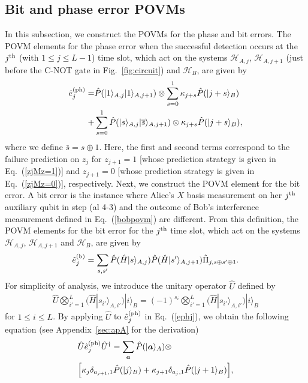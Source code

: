 \documentclass[prl,twocolumn,superscriptaddress,nofootinbib]{revtex4}
\def\U#1{{\rm #1}}
\newcommand{\ket}[1]{| #1 \rangle}
\begin{document}
  \subsection{Bit and phase error POVMs}
  \label{sec:povm}
  In this subsection, we construct the POVMs for the phase and bit errors. 
The POVM elements for the phase error when the successful detection occurs at the $j^{\U{th}}$ (with $1\leq j\leq L-1$) time slot, 
which act on the systems $\mathcal{H}_{A,j}$, $\mathcal{H}_{A,j+1}$ (just before the C-NOT gate in Fig.~\ref{fig:circuit})
and $\mathcal{H}_B$, are given by
\begin{align}
  \hat{e}^{(\U{ph})}_{j}=&\hat{P}(\ket{1}_{A,j}\ket{1}_{A,j+1})\otimes\sum^1_{s=0}\kappa_{j+s}\hat{P}(\ket{j+s}_B)\notag\\
  +&\sum^1_{s=0}\hat{P}(\ket{s}_{A,j}\ket{\overline{s}}_{A,j+1})
  \otimes\kappa_{j+s}\hat{P}(\ket{j+s}_B),
  \label{ephj}
\end{align}
where we define $\bar{s}=s\oplus1$.
Here, the first and second terms correspond to the failure prediction on $z_j$ for $z_{j+1}=1$
[whose prediction strategy is given in  Eq.~(\ref{zjMz=1})]
and $z_{j+1}=0$ [whose prediction strategy is given in Eq.~(\ref{zjMz=0})], respectively. 
Next, we construct the POVM element for the bit error. 
A bit error is the instance where Alice's $X$ basis measurement on her $j^{\U{th}}$ auxiliary 
qubit in step (al 4-3) and the outcome of Bob's interference measurement defined in Eq.~(\ref{bobpovm}) are different. 
From this definition, the POVM elements for the bit error for the $j^{\U{th}}$ time slot, 
which act on the systems $\mathcal{H}_{A,j}$, $\mathcal{H}_{A,j+1}$ and $\mathcal{H}_B$, are given by 
\begin{align}
  \hat{e}^{(\U{b})}_j=\sum_{s,s'}\hat{P}(\hat{H}\ket{s}_{A,j})\hat{P}(\hat{H}\ket{s'}_{A,j+1})\hat{\Pi}_{j,s\oplus s'\oplus1}.
  \label{biterrorPOVM}
\end{align}
For simplicity of analysis, we introduce the unitary operator $\hat{U}$ defined by
\begin{align}
  \hat{U}\bigotimes^L_{i'=1}(\hat{H}\ket{s_{i'}}_{A,i'})\ket{i}_B=(-1)^{s_i}\bigotimes^L_{i'=1}(\hat{H}\ket{s_{i'}}_{A,i'})\ket{i}_B
  \label{unitary}
\end{align}
for $1\leq i\leq L$. 
By applying $\hat{U}$ to $\hat{e}^{(\U{ph})}_{j}$ in Eq.~(\ref{ephj}), we obtain
the following equation (see Appendix~\ref{sec:apA} for the derivation)
\begin{align}
  &\hat{U}\hat{e}^{(\U{ph})}_{j}\hat{U}^{\dagger}=\sum_{\bm{a}}\hat{P}(\ket{\bm{a}}_A)\otimes\notag\\
  &\Big[\kappa_j
    \delta_{a_{j+1},1}\hat{P}(\ket{j}_B)+\kappa_{j+1}\delta_{a_j,1}\hat{P}(\ket{j+1}_B)\Big],
  \label{unieph}
\end{align}
\end{document}
